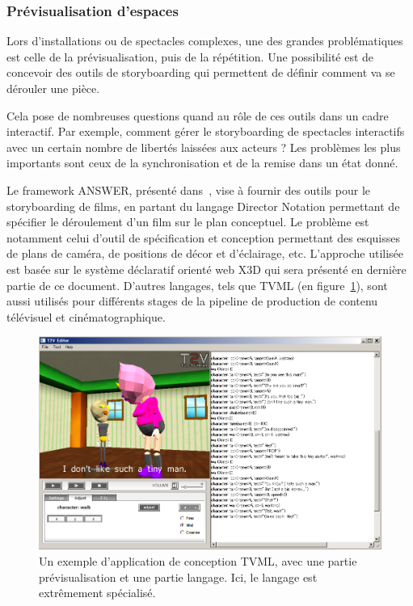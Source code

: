 \documentclass[french,12pt]{article}
\begin{document}
\subsubsection{Prévisualisation d'espaces}
Lors d'installations ou de spectacles complexes, une des grandes problématiques est celle de la prévisualisation, puis de la répétition.
Une possibilité est de concevoir des outils de storyboarding qui permettent de définir comment va se dérouler une pièce.

Cela pose de nombreuses questions quand au rôle de ces outils dans un cadre interactif. Par exemple, comment gérer le storyboarding de spectacles interactifs avec 
un certain nombre de libertés laissées aux acteurs ? Les problèmes les plus importants sont ceux de la synchronisation et de la remise dans un état donné.

Le framework ANSWER, présenté dans~\cite{jung_storyboarding_2010}, vise à fournir des outils pour le storyboarding de films, en partant 
du langage Director Notation permettant de spécifier le déroulement d'un film sur le plan conceptuel. Le problème est notamment
celui d'outil de spécification et conception permettant des esquisses de plans de caméra, de positions de décor et d'éclairage, etc.
L'approche utilisée est basée sur le système déclaratif orienté web X3D qui sera présenté en dernière partie de ce document.
D'autres langages, tels que TVML (en figure~\ref{fig.tvml}), sont aussi utilisés pour différents stages de la pipeline de production de contenu télévisuel et cinématographique.

\begin{figure}[h]
    \centering
    \includegraphics[scale=0.35]{images/tvml.png}
    \caption{Un exemple d'application de conception TVML, avec une partie prévisualisation et une partie langage. Ici, le langage est extrêmement spécialisé.}
    \label{fig.tvml}
\end{figure}
\end{document}
